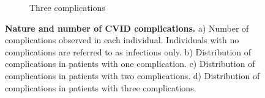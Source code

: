 \begin{figure}[H]
\begin{subfigure}[b]{0.49\textwidth}
	\caption{Three complications}%
\end{subfigure}
\caption[Nature and number of CVID complications]{\textbf{Nature and number of CVID complications.} a) Number of complications observed in each individual. Individuals with no complications are referred to as infections only. b) Distribution of complications in patients with one complication. c)  Distribution of complications in patients with two complications. d)  Distribution of complications in patients with three complications. \parencite{Chapel2008}}
\label{fig:complications.intro.cvid}
\end{figure}


